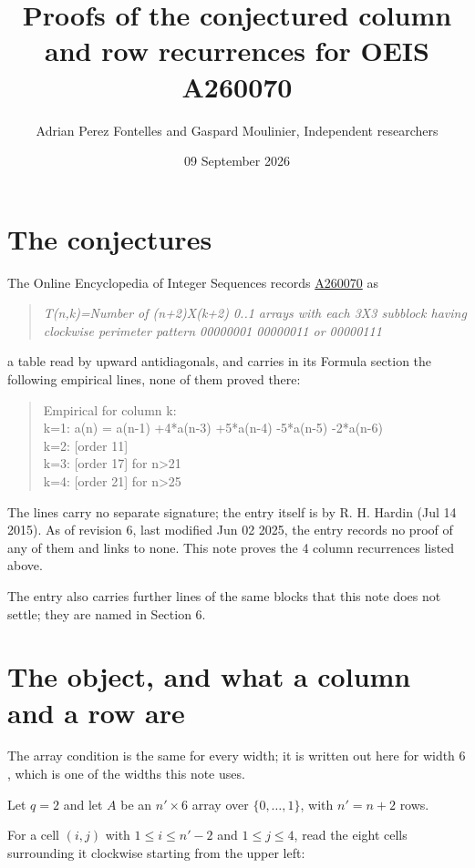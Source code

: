 \documentclass[11pt]{article}
\title{Proofs of the conjectured column and row recurrences for OEIS A260070}
\author{Adrian Perez Fontelles and Gaspard Moulinier, Independent researchers}
\date{09 September 2026}
\theoremstyle{definition}
\begin{document}
\maketitle
\section{The conjectures}

The Online Encyclopedia of Integer Sequences records \href{https://oeis.org/A260070}{A260070} as

\begin{quote}\itshape T(n,k)=Number of (n+2)X(k+2) 0..1 arrays with each 3X3 subblock having clockwise perimeter pattern 00000001 00000011 or 00000111\end{quote}

a table read by upward antidiagonals, and carries in its Formula section the following empirical lines, none of them proved there:

\begin{quote}\ttfamily Empirical for column k:\\
k=1: a(n) = a(n-1) +4*a(n-3) +5*a(n-4) -5*a(n-5) -2*a(n-6)\\k=2: [order 11]\\k=3: [order 17] for n>21\\k=4: [order 21] for n>25\end{quote}

The lines carry no separate signature; the entry itself is by R. H. Hardin (Jul 14 2015). As of revision 6, last modified Jun 02 2025, the entry records no proof of any of them and links to none. This note proves the 4 column recurrences listed above.

The entry also carries further lines of the same blocks that this note does not settle; they are named in Section 6.

\section{The object, and what a column and a row are}

The array condition is the same for every width; it is written out here for width $6$, which is one of the widths this note uses.

Let $q = 2$ and let $A$ be an $n' \times 6$ array over $\{0,\dots,1\}$, with $n' = n + 2$ rows.

For a cell $(i,j)$ with $1 \le i \le n'-2$ and $1 \le j \le 4$, read the eight cells surrounding it clockwise starting from the upper left:
\end{document}
